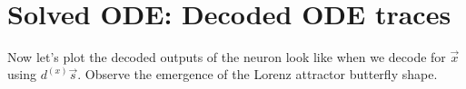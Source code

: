\documentclass{report}
\begin{document}
    \begin{center}
    \end{center}
    { \hspace*{\fill} \\}
    
\section{Solved ODE: Decoded ODE
traces}\label{solved-ode-decoded-ode-traces}

Now let's plot the decoded outputs of the neuron look like when we
decode for \(\vec{x}\) using \(d^{(x)} \vec s\). Observe the emergence
of the Lorenz attractor butterfly shape.
\end{document}
